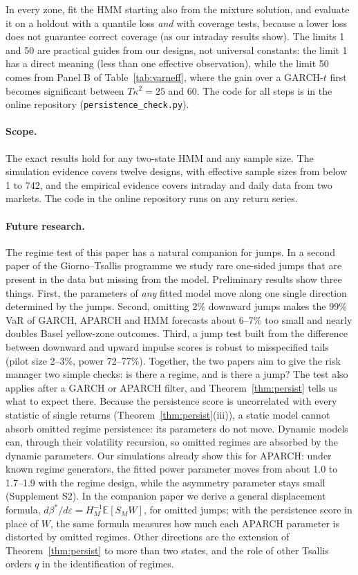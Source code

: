 \documentclass[12pt,letterpaper]{article}
\newcommand{\E}{\mathbb{E}}
\theoremstyle{plain}
\theoremstyle{remark}
\begin{document}
In every zone, fit the HMM starting also from the mixture solution, and evaluate it on a holdout with a quantile loss \emph{and} with coverage tests, because a lower loss does not guarantee correct coverage (as our intraday results show). The limits 1 and 50 are practical guides from our designs, not universal constants: the limit 1 has a direct meaning (less than one effective observation), while the limit 50 comes from Panel B of Table~\ref{tab:varneff}, where the gain over a GARCH-$t$ first becomes significant between $T\kappa^2=25$ and 60.
The code for all steps is in the online repository (\texttt{persistence\_check.py}).

\paragraph{Scope.} The exact results hold for any two-state HMM and any sample size. The simulation evidence covers twelve designs, with effective sample sizes from below 1 to 742, and the empirical evidence covers intraday and daily data from two markets. The code in the online repository runs on any return series.

\paragraph{Future research.} The regime test of this paper has a natural companion for jumps. In a second paper of the Giorno--Tsallis programme we study rare one-sided jumps that are present in the data but missing from the model. Preliminary results show three things. First, the parameters of \emph{any} fitted model move along one single direction determined by the jumps. Second, omitting 2\% downward jumps makes the 99\% VaR of GARCH, APARCH and HMM forecasts about 6--7\% too small and nearly doubles Basel yellow-zone outcomes. Third, a jump test built from the difference between downward and upward impulse scores is robust to misspecified tails (pilot size 2--3\%, power 72--77\%). Together, the two papers aim to give the risk manager two simple checks: is there a regime, and is there a jump? The test also applies after a GARCH or APARCH filter, and Theorem~\ref{thm:persist} tells us what to expect there. Because the persistence score is uncorrelated with every statistic of single returns (Theorem~\ref{thm:persist}(iii)), a static model cannot absorb omitted regime persistence: its parameters do not move. Dynamic models can, through their volatility recursion, so omitted regimes are absorbed by the dynamic parameters. Our simulations already show this for APARCH: under known regime generators, the fitted power parameter moves from about 1.0 to 1.7--1.9 with the regime design, while the asymmetry parameter stays small (Supplement S2). In the companion paper we derive a general displacement formula, $d\beta^*/d\varepsilon=H_M^{-1}\E[S_MW]$, for omitted jumps; with the persistence score in place of $W$, the same formula measures how much each APARCH parameter is distorted by omitted regimes. Other directions are the extension of Theorem~\ref{thm:persist} to more than two states, and the role of other Tsallis orders $q$ in the identification of regimes.
\end{document}

